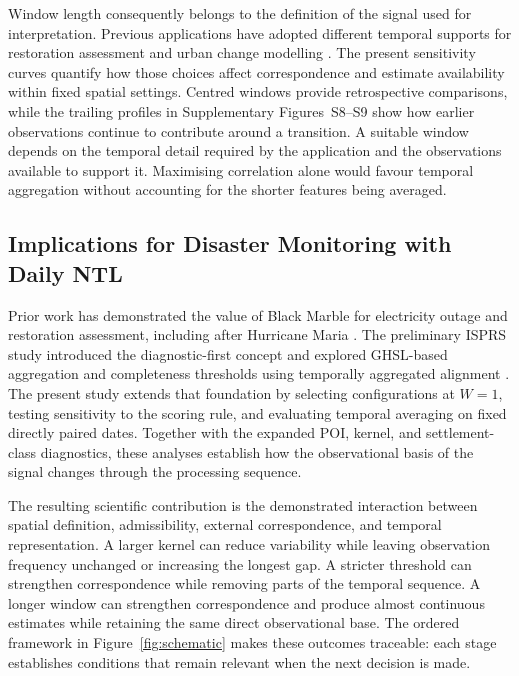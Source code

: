 \documentclass[]{interact}
\theoremstyle{plain}%
\theoremstyle{definition}
\theoremstyle{remark}
\begin{document}
        Window length consequently belongs to the definition of the signal used for interpretation. Previous applications have adopted different temporal supports for restoration assessment and urban change modelling \citep{Roman2019_PLOSone_Maria,Chakraborty2023_RSE_AdaptiveModeling}. The present sensitivity curves quantify how those choices affect correspondence and estimate availability within fixed spatial settings. Centred windows provide retrospective comparisons, while the trailing profiles in Supplementary Figures~S8--S9 show how earlier observations continue to contribute around a transition. A suitable window depends on the temporal detail required by the application and the observations available to support it. Maximising correlation alone would favour temporal aggregation without accounting for the shorter features being averaged.
    
    \subsection{Implications for Disaster Monitoring with Daily NTL}
    
        Prior work has demonstrated the value of Black Marble for electricity outage and restoration assessment, including after Hurricane Maria \citep{Roman2019_PLOSone_Maria}. The preliminary ISPRS study introduced the diagnostic-first concept and explored GHSL-based aggregation and completeness thresholds using temporally aggregated alignment \citep{Principe2026_ISPRS}. The present study extends that foundation by selecting configurations at $W=1$, testing sensitivity to the scoring rule, and evaluating temporal averaging on fixed directly paired dates. Together with the expanded POI, kernel, and settlement-class diagnostics, these analyses establish how the observational basis of the signal changes through the processing sequence.
        
        The resulting scientific contribution is the demonstrated interaction between spatial definition, admissibility, external correspondence, and temporal representation. A larger kernel can reduce variability while leaving observation frequency unchanged or increasing the longest gap. A stricter threshold can strengthen correspondence while removing parts of the temporal sequence. A longer window can strengthen correspondence and produce almost continuous estimates while retaining the same direct observational base. The ordered framework in Figure~\ref{fig:schematic} makes these outcomes traceable: each stage establishes conditions that remain relevant when the next decision is made.
        
\end{document}
